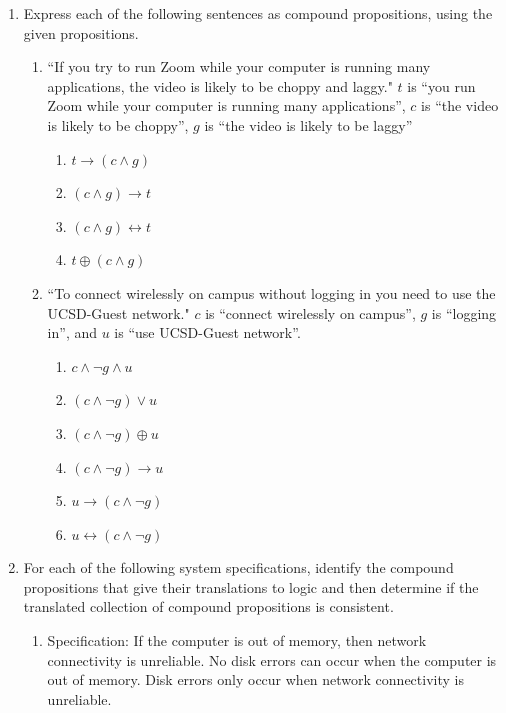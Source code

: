\documentclass[12pt, oneside]{article}
\begin{document}
\begin{enumerate}
    \item 

Express each of the following sentences as compound propositions, using
the given propositions.

\begin{enumerate}
\item ``If you try to run Zoom while your computer is running many applications,
the video is likely to be choppy and laggy." $t$ is ``you run Zoom while your
computer is running many applications'', $c$ is ``the video is likely to be choppy'',
$g$ is ``the video is likely to be laggy''
\begin{enumerate}
    \item $t \to (c \land g)$
    \item $(c \land g) \to t$
    \item $(c \land g) \leftrightarrow t$
    \item $t \oplus (c \land g)$
\end{enumerate}
\item ``To connect wirelessly on campus without logging in you need to use
the UCSD-Guest network."  $c$ is ``connect wirelessly 
on campus'', $g$ is ``logging in'', and $u$ is ``use UCSD-Guest network''.
\begin{enumerate}
    \item $c \land \lnot g \land u$
    \item $(c \land \lnot g) \lor u$
    \item $(c \land \lnot g) \oplus u$
    \item $(c \land \lnot g) \to u$
    \item $u \to (c \land \lnot g)$
    \item $u \leftrightarrow (c \land \lnot g)$
\end{enumerate}
\end{enumerate}     \item 

For each of  the following  system specifications, 
identify the compound propositions  that give their
translations to logic  and then determine if the
translated collection  of compound
propositions is consistent.

\begin{enumerate}
    \item Specification: If the computer is out of memory, then network connectivity is unreliable. No disk errors can occur when the computer is out of memory. Disk
    errors only occur when network connectivity is unreliable.
    

\end{enumerate}
\end{enumerate}
\end{document}
